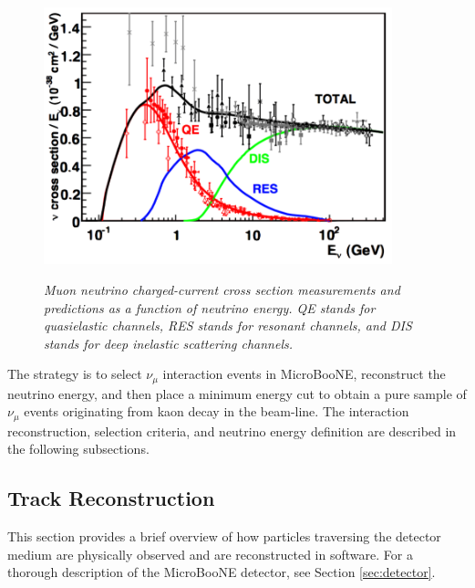 \begin{figure}[ht!]
\centering
	\includegraphics[width=0.9\textwidth]{Figures/numu_xsec_breakdown.png} \\
\caption{\textit{Muon neutrino charged-current cross section measurements and predictions as a function of neutrino energy. QE stands for quasielastic channels, RES stands for resonant channels, and DIS stands for deep inelastic scattering channels.}}\label{bnb_xsec_breakdown_fig}
\end{figure}

The strategy is to select $\nu_\mu$ interaction events in MicroBooNE, reconstruct the neutrino energy, and then place a minimum energy cut to obtain a pure sample of $\nu_\mu$ events originating from kaon decay in the beam-line. The interaction reconstruction, selection criteria, and neutrino energy definition are described in the following subsections.

\subsection{Track Reconstruction}
This section provides a brief overview of how particles traversing the detector medium are physically observed and are reconstructed in software. For a thorough description of the MicroBooNE detector, see Section \ref{sec:detector}.\\

